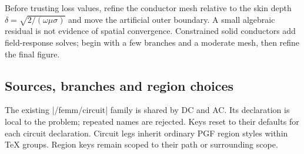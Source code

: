 Before trusting loss values, refine the conductor mesh relative to the skin
depth $\delta=\sqrt{2/(\omega\mu\sigma)}$ and move the artificial outer boundary.
A small algebraic residual is not evidence of spatial convergence. Constrained
solid conductors add field-response solves; begin with a few branches and a
moderate mesh, then refine the final figure.

\subsection{Sources, branches and region choices}
The existing |/femm/circuit| family is shared by DC and AC. Its declaration is
local to the problem; repeated names are rejected. Keys reset to their defaults
for each circuit declaration. Circuit legs inherit ordinary PGF region styles
within TeX groups. Region keys remain scoped to their path or surrounding scope.

